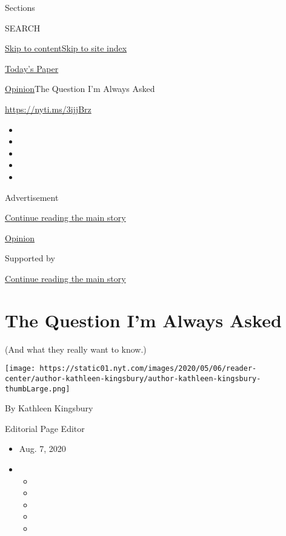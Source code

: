 Sections

SEARCH

\protect\hyperlink{site-content}{Skip to
content}\protect\hyperlink{site-index}{Skip to site index}

\href{https://myaccount.nytimes.com/auth/login?response_type=cookie\&client_id=vi}{}

\href{https://www.nytimes.com/section/todayspaper}{Today's Paper}

\href{/section/opinion}{Opinion}\textbar{}The Question I'm Always Asked

\href{https://nyti.ms/3ijjBrz}{https://nyti.ms/3ijjBrz}

\begin{itemize}
\item
\item
\item
\item
\item
\end{itemize}

Advertisement

\protect\hyperlink{after-top}{Continue reading the main story}

\href{/section/opinion}{Opinion}

Supported by

\protect\hyperlink{after-sponsor}{Continue reading the main story}

\hypertarget{the-question-im-always-asked}{%
\section{The Question I'm Always
Asked}\label{the-question-im-always-asked}}

(And what they really want to know.)

\texttt{[image: https://static01.nyt.com/images/2020/05/06/reader-center/author-kathleen-kingsbury/author-kathleen-kingsbury-thumbLarge.png]}

By Kathleen Kingsbury

Editorial Page Editor

\begin{itemize}
\item
  Aug. 7, 2020
\item
  \begin{itemize}
  \item
  \item
  \item
  \item
  \item
  \end{itemize}
\end{itemize}

